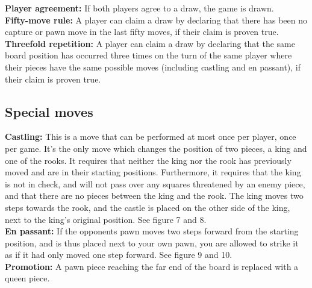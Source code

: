 \documentclass{article}
\begin{document}
\noindent
\textbf{Player agreement:} If both players agree to a draw, the game is drawn.\\

\noindent
\textbf{Fifty-move rule:} A player can claim a draw by declaring that there has been no capture or pawn move in the last fifty moves, if their claim is proven true.\\

\noindent
\textbf{Threefold repetition:} A player can claim a draw by declaring that the same board position has occurred three times on the turn of the same player where their pieces have the same possible moves (including castling and en passant), if their claim is proven true.

\newpage
\subsection*{Special moves}
\textbf{Castling:} This is a move that can be performed at most once per player, once per game. It's the only move which changes the position of two pieces, a king and one of the rooks. It requires that neither the king nor the rook has previously moved and are in their starting positions. Furthermore, it requires that the king is not in check, and will not pass over any squares threatened by an enemy piece, and that there are no pieces between the king and the rook. The king moves two steps towards the rook, and the castle is placed on the other side of the king, next to the king's original position. See figure 7 and 8. \\

\noindent
\textbf{En passant:} If the opponents pawn moves two steps forward from the starting position, and is thus placed next to your own pawn, you are allowed to strike it as if it had only moved one step forward. See figure 9 and 10.\\

\noindent
\textbf{Promotion:} A pawn piece reaching the far end of the board is replaced with a queen piece.
\end{document}
